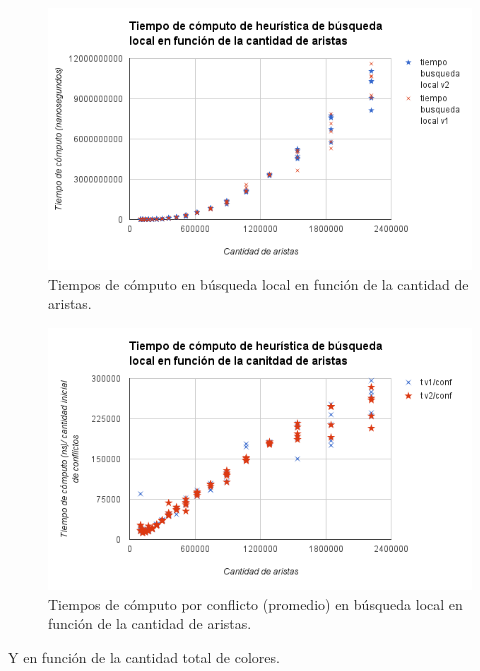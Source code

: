 \begin{figure}[H]
	\centering
 	\includegraphics[width=18cm]{imagenes/Ej4/TvsAristas1.png}
	\caption{Tiempos de cómputo en búsqueda local en función de la cantidad de aristas.}
	\label{aristasEj4-1}
 \end{figure}
 
 \begin{figure}[H]
	\centering
 	\includegraphics[width=18cm]{imagenes/Ej4/TvsAristas2.png}
	\caption{Tiempos de cómputo por conflicto (promedio) en búsqueda local en función de la cantidad de aristas.}
	\label{aristasEj4-2}
 \end{figure}
 
 
 Y en función de la cantidad total de colores.
 
